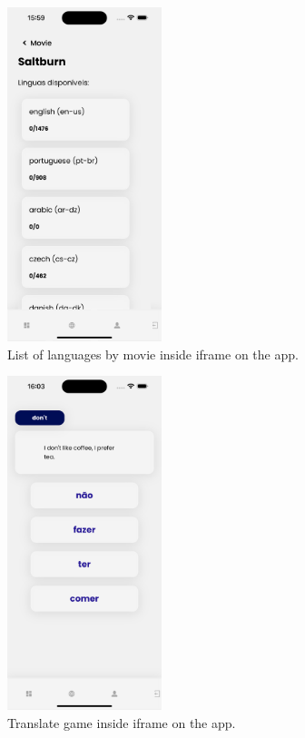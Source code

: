 \documentclass[12pt]{article}
\begin{document}
  \begin{figure}
    \centering
    \caption{
     List of languages by movie inside iframe on the app.
    }
    \label{fig:app5}
    \includegraphics[width=0.4\textwidth]{assets/18.png}
  \end{figure}

  \begin{figure}
    \centering
    \caption{
     Translate game inside iframe on the app.
    }
    \label{fig:app6}
    \includegraphics[width=0.4\textwidth]{assets/19.png}
  \end{figure}
\end{document}
